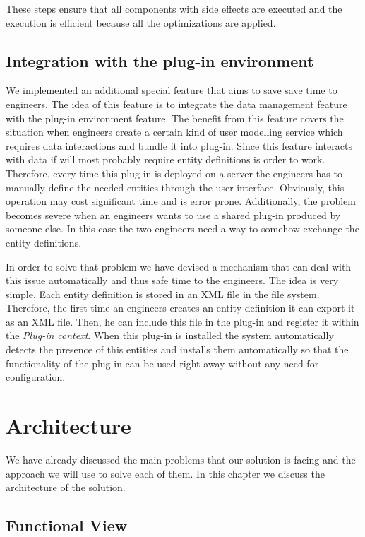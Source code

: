 These steps ensure that all components with side effects are executed and the execution is efficient because all the optimizations are applied.

\subsection{Integration with the plug-in environment}

We implemented an additional special feature that aims to save save time to engineers. The idea of this feature is to integrate the data management feature with the plug-in environment feature. The benefit from this feature covers the situation when engineers create a certain kind of user modelling service which requires data interactions and  bundle it into plug-in. Since this feature interacts with data if will most probably require entity definitions is order to work. Therefore, every time this plug-in is deployed on a server the engineers has to manually define the needed entities through the user interface. Obviously, this operation may cost significant time and is error prone. Additionally, the problem becomes severe when an engineers wants to use a shared plug-in produced by someone else. In this case the two engineers need a way to somehow exchange the entity definitions.

In order to solve that problem we have devised a mechanism that can deal with this issue automatically and thus safe time to the engineers. The idea is very simple. Each entity definition is stored in an XML file in the file system. Therefore, the first time an engineers creates an entity definition it can export it as an XML file. Then, he can include this file in the plug-in and register it within the \textit{Plug-in context}. When this plug-in is installed the system automatically detects the presence of this entities and installs them automatically so that the functionality of the plug-in can be used right away without any need for configuration.

\section{Architecture}
We have already discussed the main problems that our solution is facing and the approach we will use to solve each of them. In this chapter we discuss the architecture of the solution.

\subsection{Functional View}

